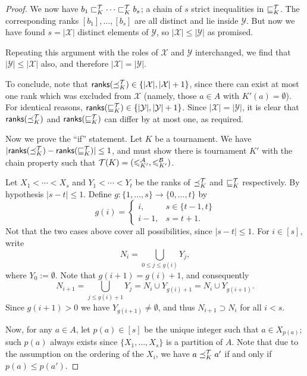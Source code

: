 \begin{proof}
    We now have $b_1 \sqsubset_K^{\mathcal{T}} \cdots \sqsubset_K^{\mathcal{T}} b_s$; a chain of $s$ strict
    inequalities in $\sqsubseteq_K^{\mathcal{T}}$. The corresponding ranks $[b_1], \ldots,
    [b_s]$ are all distinct and lie inside $\mathcal{Y}$. But now we have found
    $s = |\mathcal{X}|$ distinct elements of $\mathcal{Y}$, so $|\mathcal{X}|
    \le |\mathcal{Y}|$ as promised.

    Repeating this argument with the roles of $\mathcal{X}$ and $\mathcal{Y}$
    interchanged, we find that $|\mathcal{Y}| \le |\mathcal{X}|$ also, and
    therefore $|\mathcal{X}| = |\mathcal{Y}|$.

    To conclude, note that $\mathsf{ranks}({\preceq_K^{\mathcal{T}}}) \in \{|\mathcal{X}|,
    |\mathcal{X}| + 1\}$, since there can exist at most one rank which was
    excluded from $\mathcal{X}$ (namely, those $a \in A$ with $K'(a) =
    \emptyset$). For identical reasons, $\mathsf{ranks}({\sqsubseteq_K^{\mathcal{T}}}) \in
    \{|\mathcal{Y}|, |\mathcal{Y}| + 1\}$. Since $|\mathcal{X}| =
    |\mathcal{Y}|$, it is clear that $\mathsf{ranks}({\preceq_K^{\mathcal{T}}})$ and
    $\mathsf{ranks}({\sqsubseteq_K^{\mathcal{T}}})$ can differ by at most one, as required.

    Now we prove the ``if'' statement. Let $K$ be a tournament. We have
    $|\mathsf{ranks}({\preceq_K^{\mathcal{T}}}) - \mathsf{ranks}({\sqsubseteq_K^{\mathcal{T}}})| \le 1$, and must show there is
    tournament $K'$ with the chain property such that $\mathcal{T}(K) = ({\leqslant^{\mathcal{A}}_{K'}},
    {\leqslant^{\mathcal{B}}_{K'}})$.

    Let $X_1 < \cdots < X_s$ and $Y_1 < \cdots < Y_t$ be the ranks of
    $\preceq_K^{\mathcal{T}}$ and $\sqsubseteq_K^{\mathcal{T}}$ respectively. By hypothesis $|s - t| \le
    1$. Define $g: \{1,\ldots,s\} \to \{0,\ldots,t\}$ by
    \[
        g(i) = \begin{cases}
            i,& s \in \{t-1, t\} \\
            i - 1,& s = t + 1.
        \end{cases}
    \]
    Not that the two cases above cover all possibilities, since $|s - t| \le
    1$. For $i \in [s]$, write
    \[
        N_i = \bigcup_{0 \le j \le g(i)}{Y_j},
    \]
    where $Y_0 := \emptyset$. Note that $g(i+1) = g(i) + 1$, and consequently
    \[
        N_{i+1}
        = \bigcup_{j \le g(i) + 1}{Y_j}
        = N_i \cup Y_{g(i) + 1}
        = N_i \cup Y_{g(i + 1)}.
    \]
    Since $g(i+1) > 0$ we have $Y_{g(i+1)} \ne \emptyset$, and thus $N_{i+1}
    \supset N_i$ for all $i < s$.

    Now, for any $a \in A$, let $p(a) \in [s]$ be the unique integer such that
    $a \in X_{p(a)}$; such $p(a)$ always exists since $\{X_1,\ldots,X_s\}$ is a
    partition of $A$. Note that due to the assumption on the ordering of the
    $X_i$, we have $a \preceq_K^{\mathcal{T}} a'$ if and only if $p(a) \le p(a')$.


\end{proof}
